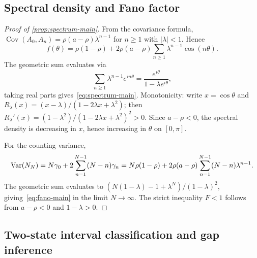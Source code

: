 \subsection{Spectral density and Fano factor}

\begin{proof}[Proof of \cref{prop:spectrum-main}]
From the covariance formula, $\operatorname{Cov}(A_0,A_n)=\rho(a-\rho)\lambda^{n-1}$ for $n\ge1$ with $|\lambda|<1$. Hence
\[
f(\theta) = \rho(1-\rho)+2\rho(a-\rho)\sum_{n\ge1}\lambda^{n-1}\cos(n\theta).
\]
The geometric sum evaluates via
\[
\sum_{n\ge1}\lambda^{n-1}e^{in\theta} = \frac{e^{i\theta}}{1-\lambda e^{i\theta}},
\]
taking real parts gives~\eqref{eq:spectrum-main}. Monotonicity: write $x=\cos\theta$ and $R_\lambda(x)=(x-\lambda)/(1-2\lambda x+\lambda^2)$; then $R_\lambda'(x)=(1-\lambda^2)/(1-2\lambda x+\lambda^2)^2>0$. Since $a-\rho<0$, the spectral density is decreasing in $x$, hence increasing in $\theta$ on $[0,\pi]$.

For the counting variance,
\[
\mathrm{Var}(N_N) = N\gamma_0 + 2\sum_{n=1}^{N-1}(N-n)\gamma_n
= N\rho(1-\rho) + 2\rho(a-\rho)\sum_{n=1}^{N-1}(N-n)\lambda^{n-1}.
\]
The geometric sum evaluates to $(N(1-\lambda)-1+\lambda^N)/(1-\lambda)^2$, giving~\eqref{eq:fano-main} in the limit $N\to\infty$. The strict inequality $F<1$ follows from $a-\rho<0$ and $1-\lambda>0$.
\end{proof}

\subsection{Two-state interval classification and gap inference}

